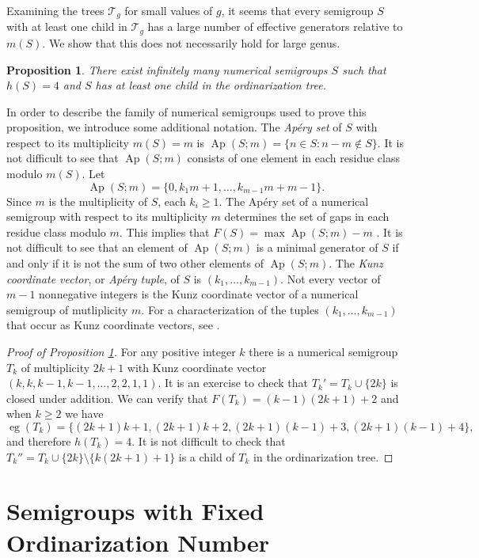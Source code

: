\documentclass[12pt]{amsart}
\DeclareMathOperator{\Ap}{Ap}
\DeclareMathOperator{\eg}{eg}
\newcommand{\T}{{\mathcal T}}
\theoremstyle{plain}\newtheorem{proposition}{Proposition}[section]
\newtheorem{prop}[proposition]{Proposition}
\begin{document}
Examining the trees $\T_g$ for small values of $g$, it seems that every semigroup $S$ with at least one child in $\T_g$ has a large number of effective generators relative to $m(S)$.  We show that this does not necessarily hold for large genus. 
\begin{prop}\label{prop:h4_parent}
There exist infinitely many numerical semigroups $S$ such that $h(S) = 4$ and $S$ has at least one child in the ordinarization tree.
\end{prop}

In order to describe the family of numerical semigroups used to prove this proposition, we introduce some additional notation.  The \emph{Ap\'ery set} of $S$ with respect to its multiplicity $m(S) = m$ is $\Ap(S;m) = \{n \in S \colon n -m \not\in S\}$.  It is not difficult to see that $\Ap(S;m)$ consists of one element in each residue class modulo $m(S)$.  Let 
\[
\Ap(S;m) = \{0,k_1 m + 1,\ldots, k_{m-1}m + m-1\}.
\]  
Since $m$ is the multiplicity of $S$, each $k_i \ge 1$.  The Ap\'ery set of a numerical semigroup with respect to its multiplicity $m$ determines the set of gaps in each residue class modulo $m$.  This implies that $F(S) = \max \Ap(S;m) - m$ \cite[Proposition 2.12]{GarciaSanchez_Rosales}.  It is not difficult to see that an element of $\Ap(S;m)$ is a minimal generator of $S$ if and only if it is not the sum of two other elements of $\Ap(S;m)$.  The \emph{Kunz coordinate vector},  or \emph{Ap\'ery tuple}, of $S$ is $(k_1,\ldots, k_{m-1})$.  Not every vector of $m-1$ nonnegative integers is the Kunz coordinate vector of a numerical semigroup of mutliplicity $m$.  For a characterization of the tuples $(k_1,\ldots, k_{m-1})$ that occur as Kunz coordinate vectors, see \cite{kunz, kunzcoords}.

\begin{proof}[Proof of Proposition \ref{prop:h4_parent}]
For any positive integer $k$ there is a numerical semigroup $T_k$ of multiplicity $2k+1$ with Kunz coordinate vector $(k,k,k-1,k-1,\ldots,2,2,1,1)$.  It is an exercise to check that $T_k' = T_k \cup \{2k\}$ is closed under addition.  We can verify that $F(T_k) = (k-1) (2k+1) +2$ and when $k \ge 2$ we have 
\[
\eg(T_k) = \{(2k+1)k+1, (2k+1)k+2,(2k+1)(k-1)+3,(2k+1)(k-1)+4\},
\] 
and therefore $h(T_k) = 4$. It is not difficult to check that $T_k'' = T_k \cup \{2k\} \setminus \{k(2k+1) +1\}$ is a child of $T_k$ in the ordinarization tree.
\end{proof}


\section{Semigroups with Fixed Ordinarization Number}\label{sec:ng2}
\end{document}
